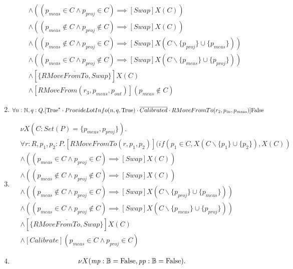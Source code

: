 \begin{enumerate}
\begin{align*}
            &\wedge ((p_\mathit{meas} \in C \wedge p_\mathit{proj} \in C) \implies [Swap]X(C))\\
            &\wedge ((p_\mathit{meas} \notin C \wedge p_\mathit{proj} \notin C) \implies [Swap]X(C))\\
            &\wedge ((p_\mathit{meas} \notin C \wedge p_\mathit{proj} \in C) \implies [Swap]X(C\backslash\{p_\mathit{proj}\} \cup \{p_\mathit{meas}\}))\\
            &\wedge ((p_\mathit{meas} \in C \wedge p_\mathit{proj} \notin C) \implies [Swap]X(C\backslash\{p_\mathit{meas}\} \cup \{p_\mathit{proj}\}))\\
            &\wedge [\overline{\{RMoveFromTo, Swap\}}]X(C)\\
            &\wedge [RMoveFrom(r_3,p_\mathit{meas}, p_\mathit{out})](p_\mathit{meas} \notin C)
        \end{align*}
    \item $\forall n:\mathbb{N},q:Q.[\text{True}^{*}\cdot ProvideLotInfo(n,q,\text{True})\cdot \overline{Calibrated}\cdot RMoveFromTo(r_2, p_\mathit{in}, p_\mathit{meas})]\text{False}$
    \item \begin{align*}
    		&\nu X(C : Set(P) = \{p_\mathit{meas},p_\mathit{proj}\}).\\
            & \forall r:R, p_1, p_2 : P . [RMoveFromTo(r, p_1, p_2)](if(p_1 \in C, X(C\backslash\{p_1\}\cup\{p_2\}), X(C))\\
            &\wedge ((p_\mathit{meas} \in C \wedge p_\mathit{proj} \in C) \implies [Swap]X(C))\\
            &\wedge ((p_\mathit{meas} \notin C \wedge p_\mathit{proj} \notin C) \implies [Swap]X(C))\\
            &\wedge ((p_\mathit{meas} \notin C \wedge p_\mathit{proj} \in C) \implies [Swap]X(C\backslash\{p_\mathit{proj}\} \cup \{p_\mathit{meas}\}))\\
            &\wedge ((p_\mathit{meas} \in C \wedge p_\mathit{proj} \notin C) \implies [Swap]X(C\backslash\{p_\mathit{meas}\} \cup \{p_\mathit{proj}\}))\\
            &\wedge [\overline{\{RMoveFromTo, Swap\}}]X(C)\\
            &\wedge [Calibrate](p_\mathit{meas} \in C \wedge p_\mathit{proj} \in C)
        \end{align*}
    \item \begin{align*}
        &\nu X(\mathit{mp}: \mathbb{B} = \false, \mathit{pp}: \mathbb{B} = \false).\\

\end{align*}
\end{enumerate}
